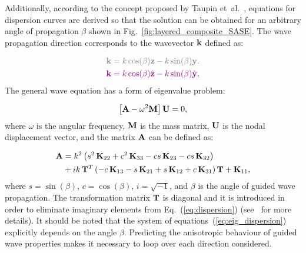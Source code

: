 	Additionally, according to the concept proposed by Taupin et~al.~\cite{Taupin2011}, 
	equations for dispersion curves are derived so that the solution can be obtained for 
	an arbitrary angle of propagation \(\beta\) shown in 
	Fig.~\ref{fig:layered_composite_SASE}. The wave propagation direction corresponds 
	to the wavevector \(\mathbf{k}\) defined as:
	
	
\begin{equation}\begin{aligned}
\DIFdelmath{
	  \vect{k} = k \cos (\beta) \vect{z} - k \sin (\beta) \vect{y}.
	}\\
\DIFaddmath{
	  \vect{k} = k \cos (\beta)\hat{ \vect{z}} - k \sin (\beta) \hat{\vect{y}},
	}
\end{aligned}
\label{eq:wavevector}\end{equation}
	 The general wave 
	equation has a form of eigenvalue problem:

	
\begin{equation}
	\left[\mathbf{A} - \omega^2\mathbf{M} \right] \mathbf{U} =0,
\label{eq:eig_dispersion}\end{equation}
	where \(\omega\) is the angular frequency, \(\mathbf{M}\) is the mass matrix, 
	\(\mathbf{U}\) is the nodal displacement vector, and the matrix \(\mathbf{A}\) can be 
	defined as:
		
\begin{equation}
	\begin{aligned}
	\mathbf{A} & =  k^2\left(s^2 \,\mathbf{K}_{22} + c^2\, \mathbf{K}_{33} - c s \, \mathbf{K}_{23} - c s\, \mathbf{K}_{32}\right) \\
	& + i k\, \mathbf{T}^T\left(-c\, \mathbf{K}_{13} - s \, \mathbf{K}_{21} + s \, \mathbf{K}_{12} + c \, \mathbf{K}_{31}\right) \mathbf{T} +\mathbf{K}_{11},
	\end{aligned}
\label{eq:dispersion}\end{equation}
	where  \(s = \sin(\beta)\), \(c = \cos(\beta)\), \(i = \sqrt{-1}\), and \(\beta\) is the angle 
	of guided wave propagation. The transformation matrix \(\mathbf{T}\) is diagonal and it 
	is introduced in order to eliminate imaginary elements from Eq.~(\ref{eq:dispersion}) 
	(see~\cite{Bartoli2006} for more details). It should be noted that the system of 
	equations~(\ref{eq:eig_dispersion}) explicitly depends on the angle \(\beta\). 
	Predicting the anisotropic behaviour of guided wave properties makes it necessary to 
	loop over each direction considered.
	

